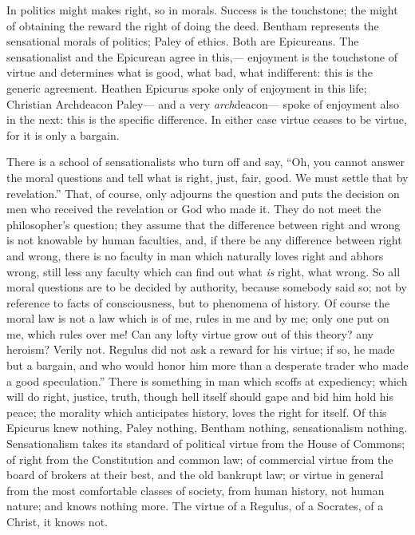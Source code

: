 \documentclass[12pt]{article}
\begin{document}
In politics might makes right, so in morals. Success is the touchstone; the might of obtaining the reward the right of doing the deed. Bentham represents the sensational morals of politics; Paley of ethics. Both are Epicureans. The sensationalist and the Epicurean agree in this,--- enjoyment is the touchstone of virtue and determines what is good, what bad, what indifferent: this is the generic agreement. Heathen Epicurus spoke only of enjoyment in this life; Christian Archdeacon Paley--- and a very \emph{arch}deacon--- spoke of enjoyment also in the next: this is the specific difference. In either case virtue ceases to be virtue, for it is only a bargain. 


There is a school of sensationalists who turn off and say, ``Oh, you cannot answer the moral questions and tell what is right, just, fair, good. We must settle that by revelation.'' That, of course, only adjourns the question and puts the decision on men who received the revelation or God who made it. They do not meet the philosopher's question; they assume that the difference between right and wrong is not knowable by human faculties, and, if there be any difference between right and wrong, there is no faculty in man which naturally loves right and abhors wrong, still less any faculty which can find out what \emph{is} right, what wrong. So all moral questions are to be decided by authority, because somebody said so; not by reference to facts of consciousness, but to phenomena of history. Of course the moral law is not a law which is of me, rules in me and by me; only one put on me, which rules over me! Can any lofty virtue grow out of this theory? any heroism? Verily not. Regulus did not ask a reward for his virtue; if so, he made but a bargain, and who would honor him more than a desperate trader who made a good speculation.'' There is something in man which scoffs at expediency; which will do right, justice, truth, though hell itself should gape and bid him hold his peace; the morality which anticipates history, loves the right for itself. Of this Epicurus knew nothing, Paley nothing, Bentham nothing, sensationalism nothing. Sensationalism takes its standard of political virtue from the House of Commons; of right from the Constitution and common law; of commercial virtue from the board of brokers at their best, and the old bankrupt law; or virtue in general from the most comfortable classes of society, from human history, not human nature; and knows nothing more. The virtue of a Regulus, of a Socrates, of a Christ, it knows not. 
\end{document}
